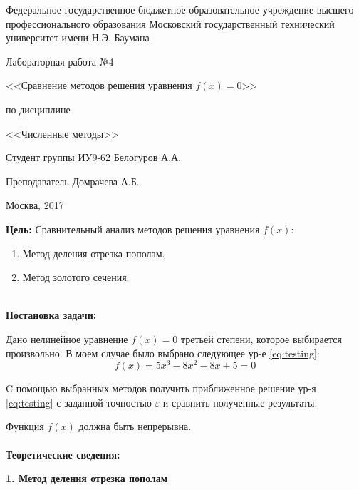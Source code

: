 \documentclass[a4paper, 12pt]{article}   	%
\begin{document}
\begin{titlepage}

\thispagestyle{empty}

\begin{center}
Федеральное государственное бюджетное образовательное учреждение высшего профессионального образования Московский государственный технический университет имени Н.Э. Баумана
\end{center}


\vfill

\centerline{\large{Лабораторная работа №4}}
\centerline{\large{<<Сравнение методов решения уравнения $f(x) =0$>>}}
\centerline{\large{по дисциплине}}
\centerline{\large{<<Численные методы>>}}

\vfill

Студент группы ИУ9-62 \hfill Белогуров А.А.

Преподаватель \hfill Домрачева А.Б.
\vfill

\centerline{Москва, 2017}
\clearpage
\end{titlepage}

\newpage
\setcounter{page}{2}

\textbf{Цель:}
Сравнительный анализ методов решения уравнения $f(x)$: 
\begin{enumerate}
\item Метод деления отрезка пополам.
\item Метод золотого сечения.
\\\\
\end{enumerate}


 
 \textbf{Постановка задачи:}
 
 Дано нелинейное уравнение $f(x) = 0$ третьей степени, которое выбирается произвольно. В моем случае было выбрано следующее ур-е \eqref{eq:testing}:
 \begin{equation}\label{eq:testing}
 f(x) = 5x^3 - 8x^2 - 8x + 5 = 0
 \end{equation}
 
 C помощью выбранных методов получить приближенное решение ур-я \eqref{eq:testing} с заданной точностью $\varepsilon$ и сравнить полученные результаты.
 
 Функция $f(x)$ должна быть непрерывна.
\\\\

\textbf{Теоретические сведения:}

\textbf{1. Метод деления отрезка пополам}
\end{document}
